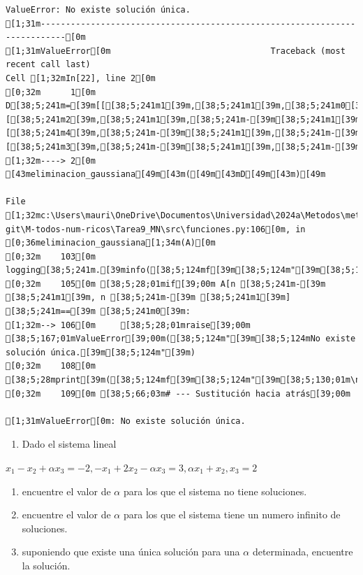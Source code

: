 \documentclass[
  letterpaper,
  DIV=11,
  numbers=noendperiod]{scrartcl}
\providecommand{\tightlist}{%
  \setlength{\itemsep}{0pt}\setlength{\parskip}{0pt}}\usepackage{longtable,booktabs,array}
\begin{document}
\begin{verbatim}
ValueError: No existe solución única.
[1;31m---------------------------------------------------------------------------[0m
[1;31mValueError[0m                                Traceback (most recent call last)
Cell [1;32mIn[22], line 2[0m
[0;32m      1[0m D[38;5;241m=[39m[[[38;5;241m1[39m,[38;5;241m1[39m,[38;5;241m0[39m,[38;5;241m1[39m,[38;5;241m2[39m],[[38;5;241m2[39m,[38;5;241m1[39m,[38;5;241m-[39m[38;5;241m1[39m,[38;5;241m1[39m,[38;5;241m1[39m],[[38;5;241m4[39m,[38;5;241m-[39m[38;5;241m1[39m,[38;5;241m-[39m[38;5;241m2[39m,[38;5;241m2[39m,[38;5;241m0[39m],[[38;5;241m3[39m,[38;5;241m-[39m[38;5;241m1[39m,[38;5;241m-[39m[38;5;241m1[39m,[38;5;241m2[39m,[38;5;241m-[39m[38;5;241m3[39m]]
[1;32m----> 2[0m [43meliminacion_gaussiana[49m[43m([49m[43mD[49m[43m)[49m

File [1;32mc:\Users\mauri\OneDrive\Documentos\Universidad\2024a\Metodos\metodos git\M-todos-num-ricos\Tarea9_MN\src\funciones.py:106[0m, in [0;36meliminacion_gaussiana[1;34m(A)[0m
[0;32m    103[0m     logging[38;5;241m.[39minfo([38;5;124mf[39m[38;5;124m"[39m[38;5;130;01m\n[39;00m[38;5;132;01m{[39;00mA[38;5;132;01m}[39;00m[38;5;124m"[39m)
[0;32m    105[0m [38;5;28;01mif[39;00m A[n [38;5;241m-[39m [38;5;241m1[39m, n [38;5;241m-[39m [38;5;241m1[39m] [38;5;241m==[39m [38;5;241m0[39m:
[1;32m--> 106[0m     [38;5;28;01mraise[39;00m [38;5;167;01mValueError[39;00m([38;5;124m"[39m[38;5;124mNo existe solución única.[39m[38;5;124m"[39m)
[0;32m    108[0m     [38;5;28mprint[39m([38;5;124mf[39m[38;5;124m"[39m[38;5;130;01m\n[39;00m[38;5;132;01m{[39;00mA[38;5;132;01m}[39;00m[38;5;124m"[39m)
[0;32m    109[0m [38;5;66;03m# --- Sustitución hacia atrás[39;00m

[1;31mValueError[0m: No existe solución única.
\end{verbatim}

\begin{enumerate}
\def\labelenumi{\arabic{enumi}.}
\setcounter{enumi}{4}
\tightlist
\item
  Dado el sistema lineal
\end{enumerate}

\(x_1 - x_2 + \alpha x_3 = -2, -x_1 + 2x_2 - \alpha x_3 = 3, \alpha x_1 +x_2, x_3 = 2\)

\begin{enumerate}
\def\labelenumi{\alph{enumi}.}
\item
  encuentre el valor de \(\alpha\) para los que el sistema no tiene
  soluciones.
\item
  encuentre el valor de \(\alpha\) para los que el sistema tiene un
  numero infinito de soluciones.
\item
  suponiendo que existe una única solución para una \(\alpha\)
  determinada, encuentre la solución.
\end{enumerate}
\end{document}
